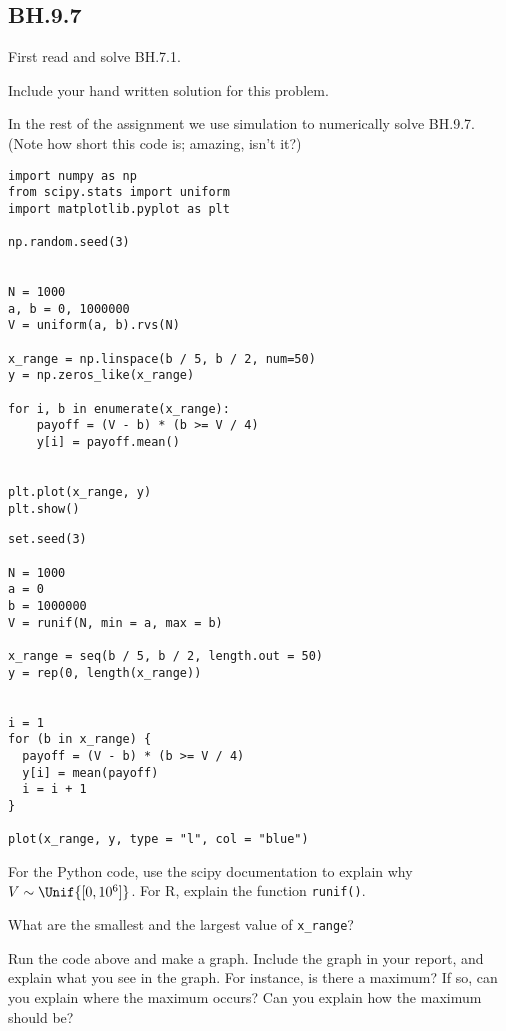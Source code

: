 \subsection{BH.9.7}
\label{sec:bh.9.7}

First read and solve BH.7.1.

\begin{exercise}
Include your hand written solution for this problem.
\end{exercise}

In the rest of the assignment we use  simulation to numerically solve  BH.9.7. (Note how short  this code is;  amazing, isn't it?)


\begin{verbatim}
import numpy as np
from scipy.stats import uniform
import matplotlib.pyplot as plt

np.random.seed(3)


N = 1000
a, b = 0, 1000000
V = uniform(a, b).rvs(N)

x_range = np.linspace(b / 5, b / 2, num=50)
y = np.zeros_like(x_range)

for i, b in enumerate(x_range):
    payoff = (V - b) * (b >= V / 4)
    y[i] = payoff.mean()


plt.plot(x_range, y)
plt.show()
\end{verbatim}

\begin{verbatim}
set.seed(3)

N = 1000
a = 0
b = 1000000
V = runif(N, min = a, max = b)

x_range = seq(b / 5, b / 2, length.out = 50)
y = rep(0, length(x_range))


i = 1
for (b in x_range) {
  payoff = (V - b) * (b >= V / 4)
  y[i] = mean(payoff)
  i = i + 1
}

plot(x_range, y, type = "l", col = "blue")
\end{verbatim}


\begin{exercise}
For the Python code, use the scipy documentation to explain why $V\sim\Unif{[0,10^{6}]}$. For R, explain the function \texttt{runif()}.
\end{exercise}



\begin{exercise}
What are the smallest and the largest value of \verb|x_range|?
\end{exercise}

\begin{exercise}
Run the code above and make a graph. Include the graph in your report, and explain what you see in the graph. For instance, is there a maximum? If so, can you explain where the maximum occurs? Can you explain how the maximum should be?
\end{exercise}


